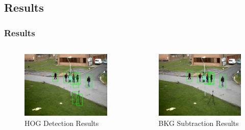\documentclass{beamer}
\begin{document}
\subsection{Results}
\begin{frame}
	\frametitle{Results}
	\begin{columns}[T]
		\begin{column}{.5\textwidth}
		\begin{figure}
		\begin{center}
			\includegraphics[width=\textwidth]{images/ImageDetector.jpg}
			\caption{HOG Detection Results}
			\label{fig:sub:ImageDetector}
		\end{center}
		\end{figure}
		\end{column}
		\begin{column}{.5\textwidth}
		\begin{figure}
		\begin{center}
			\includegraphics[width=\textwidth]{images/BKGCutDetector.jpg}
			\caption{BKG Subtraction Results}
			\label{fig:sub:BKGCutDetector}
		\end{center}
		\end{figure}
		\end{column}
	\end{columns}
\end{frame}
\end{document}
